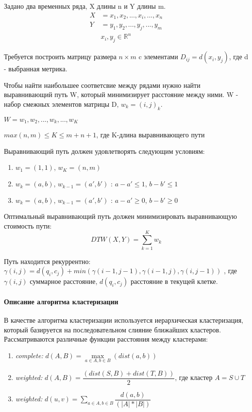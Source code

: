 \documentclass[12pt,twoside]{article}
\begin{document}
            Задано два временных ряда, X длины n и Y длины m.
            \begin{align*}
                X &= x_1,x_2, ..., x_i, ..., x_n \\
                Y &= y_1,y_2, ..., y_j, ..., y_m \\
                & x_i, y_j \in \mathbb{R}^n
            \end{align*}

            Требуется построить матрицу размера $n\times m$ c элементами $D_{ij}=d(x_i, y_j)$, где d - выбранная метрика.
            
            Чтобы найти наибольшее соответсвие между рядами нужно найти выравнивающий путь W, который минимизирует расстояние между ними.
            W - набор смежных элементов матрицы D, $w_k = (i, j)_k$.
            
            $W = w_1,w_2, ..., w_k, ..., w_K $

            $max(n, m)\leq K \leq m+n+1$, где K-длина выравнивающего пути
            
            Выравнивающий путь должен удовлетворять следующим условиям:
            \begin{enumerate}
                \item $w_1=(1,1)$, $w_K=(n, m)$
                \item $w_k = (a, b)$, $w_{k-1}=(a', b')$ : $a-a' \leq 1$, $b-b' \leq 1$ 
                \item $w_k = (a, b)$, $w_{k-1}=(a', b')$ : $a-a' \geq 0$, $b-b'\geq 0$
            \end{enumerate}

            Оптимальный выравнивающий путь должен минимизировать выравнивающую стоимость пути:
            $$
                DTW(X, Y)=\displaystyle\sum\limits_{k=1}^{K} w_k
            $$
            
            Путь находится рекуррентно:\\
            $\gamma(i, j) = d(q_i, c_j) + min({\gamma(i-1, j-1), \gamma(i-1, j), \gamma(i, j-1)})$ ,
            где $\gamma(i, j)$ суммарное расстояние, $d(q_i, c_j)$ расстояние в текущей клетке.
                
        \paragraph{Описание алгоритма кластеризации}      
            В качестве алгоритма кластеризации используется иерархическая кластеризация, который базируется на последовательном слияние ближайших кластеров.
            Рассматриваются различные функции расстояния между кластерами: 
            \begin{enumerate}
                \item \textit{complete:}  $d(A, B) = \max\limits_{a \in A, b \in B}(dist(a, b))$ 
                \item \textit{weighted:}  $d(A,B) = \dfrac{(dist(S,B) + dist(T,B))}{2}$, где кластер $A = S \cup T$
                \item \textit{weighted:}  $d(u,v) = \sum\limits_{a \in A, b \in B} \dfrac{d(a, b)}{(|A|*|B|)}$ 
            \end{enumerate} 
\end{document}
